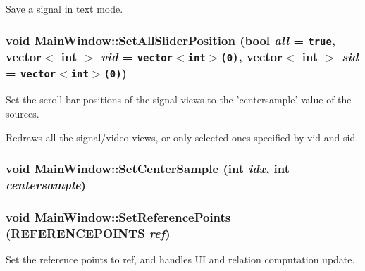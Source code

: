 Save a signal in text mode. 

\hypertarget{class_main_window_429d8336b0b052f8a04f1d449afc466d}{
\subsubsection[{SetAllSliderPosition}]{\setlength{\rightskip}{0pt plus 5cm}void MainWindow::SetAllSliderPosition (bool {\em all} = {\tt true}, \/  vector$<$ int $>$ {\em vid} = {\tt vector$<$int$>$(0)}, \/  vector$<$ int $>$ {\em sid} = {\tt vector$<$int$>$(0)})}}
\label{class_main_window_429d8336b0b052f8a04f1d449afc466d}


Set the scroll bar positions of the signal views to the 'centersample' value of the sources. 

Redraws all the signal/video views, or only selected ones specified by vid and sid. \hypertarget{class_main_window_72ed8503fa9460d9ea40f02402d1a03b}{
\subsubsection[{SetCenterSample}]{\setlength{\rightskip}{0pt plus 5cm}void MainWindow::SetCenterSample (int {\em idx}, \/  int {\em centersample})}}
\label{class_main_window_72ed8503fa9460d9ea40f02402d1a03b}


\hypertarget{class_main_window_3e233ddbde303541bd6cca204dc65a08}{
\subsubsection[{SetReferencePoints}]{\setlength{\rightskip}{0pt plus 5cm}void MainWindow::SetReferencePoints ({\bf REFERENCEPOINTS} {\em ref})}}
\label{class_main_window_3e233ddbde303541bd6cca204dc65a08}


Set the reference points to ref, and handles UI and relation computation update. 

